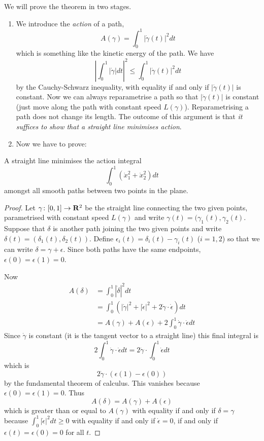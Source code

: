 We will prove the theorem in two stages.
\begin{enumerate}
\item We introduce the {\em action} of a path,
\[A(\gamma)=\int_0^1|\dot{\gamma}(t)|^2dt\]
which is something like the kinetic energy of the path. We have
\[\left|\int_0^1|\dot{\gamma}|dt\right|^2\leq\int_0^1|\dot{\gamma}(t)|^2dt\]
by the Cauchy-Schwarz inequality, with equality if and only if $|\dot{\gamma}(t)|$ is constant. Now we can always reparametrise a path so that $|\dot{\gamma}(t)|$ is constant (just move along the path with constant speed $L(\gamma)$). Reparametrising a path does not change its length. The outcome of this argument is that {\em it suffices to show that a straight line minimises action}.
\item Now we have to prove:
\end{enumerate}
\begin{prp}
A straight line minimises the action integral
\[\int_0^1\left(\dot{x}_1^2+\dot{x}_2^2\right)dt\]
amongst all smooth paths between two points in the plane.
\end{prp}
\begin{proof}
Let $\gamma\colon [0,1]\to\mathbf{R}^2$ be the straight line connecting the two given points, parametrised with constant speed $L(\gamma)$ and write $\gamma(t)=(\gamma_1(t),\gamma_2(t)$. Suppose that $\delta$ is another path joining the two given points and write $\delta(t)=(\delta_1(t),\delta_2(t))$. Define $\epsilon_i(t)=\delta_i(t)-\gamma_i(t)$ ($i=1,2$) so that we can write $\delta=\gamma+\epsilon$. Since both paths have the same endpoints, $\epsilon(0)=\epsilon(1)=0$.

Now
\begin{align*}
A(\delta)&=\int_0^1|\dot{\delta}|^2dt\\
&=\int_0^1\left(|\dot{\gamma}|^2+|\dot{\epsilon}|^2+2\dot{\gamma}\cdot\dot{\epsilon}\right)dt\\
&=A(\gamma)+A(\epsilon)+2\int_0^1\dot{\gamma}\cdot\dot{\epsilon}dt
\end{align*}
Since $\dot{\gamma}$ is constant (it is the tangent vector to a straight line) this final integral is
\[2\int_0^1\dot{\gamma}\cdot\dot{\epsilon}dt=2\dot{\gamma}\cdot\int_0^1\dot{\epsilon}dt\]
which is
\[2\dot{\gamma}\cdot(\epsilon(1)-\epsilon(0))\]
by the fundamental theorem of calculus. This vanishes because $\epsilon(0)=\epsilon(1)=0$. Thus
\[A(\delta)=A(\gamma)+A(\epsilon)\]
which is greater than or equal to $A(\gamma)$ with equality if and only if $\delta=\gamma$ because $\int_0^1|\dot{\epsilon}|^2dt\geq 0$ with equality if and only if $\dot{\epsilon}=0$, if and only if $\epsilon(t)=\epsilon(0)=0$ for all $t$.
\end{proof}

